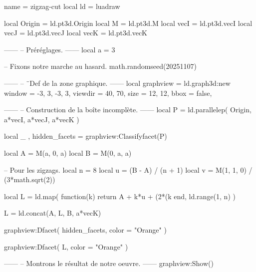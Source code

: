 \documentclass[border = 3pt]{standalone}
\begin{document}
\begin{luadraw*}{name = zigzag-cut}
local ld = luadraw

local Origin = ld.pt3d.Origin
local M      = ld.pt3d.M
local vecI   = ld.pt3d.vecI
local vecJ   = ld.pt3d.vecJ
local vecK   = ld.pt3d.vecK

------
-- Préréglages.
------
local a = 3

-- Fixons notre marche au hasard.
math.randomseed(20251107)

------
-- ¨Def de la zone graphique.
------
local graphview = ld.graph3d:new{
  window  = {-3, 3, -3, 3},
  viewdir = {40, 70},
  size    = {12, 12},
  bbox    = false,
}

------
-- Construction de la boîte incomplète.
------
local P = ld.parallelep(
  Origin,
  a*vecI, a*vecJ, a*vecK
)

local _ , hidden_facets = graphview:Classifyfacet(P)

local A = M(a, 0, a)
local B = M(0, a, a)

-- Pour les zigzags.
local n = 8
local u = (B - A) / (n + 1)
local v = M(1, 1, 0) / (3*math.sqrt(2))

local L = ld.map(
  function(k)
    return A + k*u + (2*(k%
  end,
  ld.range(1, n)
)

L = ld.concat({A}, L, {B, a*vecK})

graphview:Dfacet(
  hidden_facets,
  {color = "Orange"}
)

graphview:Dfacet(
  L,
  {color = "Orange"}
)

------
-- Montrons le résultat de notre oeuvre.
------
graphview:Show()
\end{luadraw*}
\end{document}
